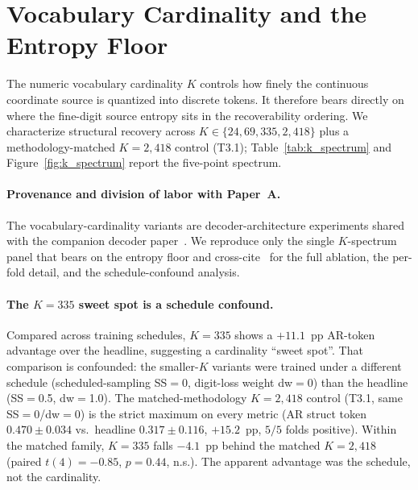 \documentclass[entropy,article,submit,moreauthors,pdftex]{Definitions/mdpi}
\begin{document}
\section{Vocabulary Cardinality and the Entropy Floor}
\label{sec:kspectrum}

The numeric vocabulary cardinality $K$ controls how finely the continuous coordinate source is quantized into discrete tokens. It therefore bears directly on where the fine-digit source entropy sits in the recoverability ordering. We characterize structural recovery across $K\in\{24, 69, 335, 2{,}418\}$ plus a methodology-matched $K=2{,}418$ control (T3.1); Table~\ref{tab:k_spectrum} and Figure~\ref{fig:k_spectrum} report the five-point spectrum.

\paragraph{Provenance and division of labor with Paper~A.} The vocabulary-cardinality variants are decoder-architecture experiments shared with the companion decoder paper~\cite{paperA_decoder}. We reproduce only the single $K$-spectrum panel that bears on the entropy floor and cross-cite~\cite{paperA_decoder} for the full ablation, the per-fold detail, and the schedule-confound analysis.

\paragraph{The $K=335$ sweet spot is a schedule confound.} Compared across training schedules, $K=335$ shows a $+11.1$~pp AR-token advantage over the headline, suggesting a cardinality ``sweet spot''. That comparison is confounded: the smaller-$K$ variants were trained under a different schedule (scheduled-sampling SS$=$0, digit-loss weight dw$=$0) than the headline (SS$=$0.5, dw$=$1.0). The matched-methodology $K=2{,}418$ control (T3.1, same SS$=$0/dw$=$0) is the strict maximum on every metric (AR struct token $0.470\pm0.034$ vs.\ headline $0.317\pm0.116$, $+15.2$~pp, $5/5$ folds positive). Within the matched family, $K=335$ falls $-4.1$~pp behind the matched $K=2{,}418$ (paired $t(4)=-0.85$, $p=0.44$, n.s.). The apparent advantage was the schedule, not the cardinality.
\end{document}
